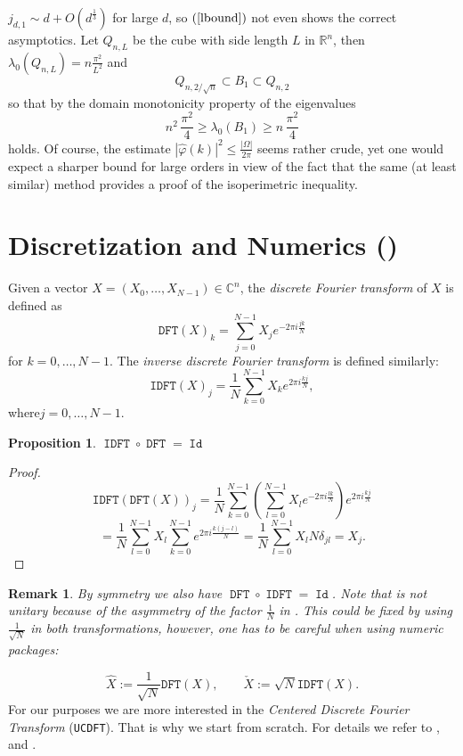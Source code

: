 \documentclass[12pt,a4paper]{article}
\newcommand{\RR}[1]{\mathbb{R}^#1}
\newtheorem{prop}{Proposition}
\newtheorem{remark}{Remark}
\newcommand{\assign}{:=}
\newcommand{\tmem}[1]{{\em #1\/}}
\newcommand{\tmop}[1]{\ensuremath{\operatorname{#1}}}
\newcommand{\tmverbatim}[1]{{\ttfamily{#1}}}
\begin{document}
\begin{appendices}
$j_{d,1} \sim d+O(d^\frac{1}{3})$ for large $d$, so $(\ref{lbound})$ not even
shows the correct asymptotics. Let $Q_{n,L}$ be the cube with side length $L$ in
$\RR n$, then $\lambda_0(Q_{n,L})=n \frac{\pi^2}{L^2}$ and
%
\begin{displaymath}
     Q_{n,{2/\sqrt{n}}} \subset B_1 \subset Q_{n,2}
\end{displaymath}   
%
so that by the domain monotonicity property of the eigenvalues
%
\begin{displaymath}
        n^2\,\frac{\pi^2}{4}\geq \lambda_0(B_1) \geq n\,\frac{\pi^2}{4}
\end{displaymath}
holds. Of course, the estimate $|\hat\varphi(k)|^2\leq\frac{|\Omega|}{2\pi}$ seems
rather crude, yet one would expect a sharper bound for large orders in view of the
fact that the same (at least similar) method provides a proof of the isoperimetric
inequality.     
\section{Discretization and Numerics  (\tmverbatim{UCDFT})}
Given a vector $X = (X_0, \ldots, X_{N - 1}) \in \mathbb{C}^n$, the
{\tmem{discrete Fourier transform}} of $X$ is defined as
\[ \mathtt{DFT} (X)_k = \sum_{j = 0}^{N - 1} X_j e^{- 2 \pi i \frac{jk}{N}}
\]
for $k = 0, \ldots, N - 1.$ The {\tmem{inverse discrete Fourier transform}} is
defined similarly:
\[ \mathtt{IDFT} (X)_j = \frac{1}{N} \sum_{k = 0}^{N - 1} X_k e^{2 \pi i
   \frac{kj}{N}}, \]
where$j = 0, \ldots, N - 1.$
\begin{prop}
  $\mathtt{\tmop{IDFT} \circ \tmop{DFT} = \tmop{Id}}$
\end{prop}
\begin{proof}
  \[ \mathtt{IDFT} \left( \mathtt{DFT} (X) \right)_j = \frac{1}{N} \sum_{k =
     0}^{N - 1} \left( \sum_{l = 0}^{N - 1} X_l e^{- 2 \pi i \frac{lk}{N}}
     \right) e^{2 \pi i \frac{kj}{N}} \]
  \[ = \frac{1}{N} \sum_{l = 0}^{N - 1} X_l  \sum_{k = 0}^{N - 1} e^{2 \pi i
     \frac{k (j - l)}{N}} = \frac{1}{N} \sum_{l = 0}^{N - 1} X_l N \delta_{j
     l} = X_j . \]
%  
\end{proof}
%
\begin{remark}
  By symmetry we also have $\mathtt{\tmop{DFT} \circ \tmop{IDFT} =
  \tmop{Id}}$. Note that \tmverbatim{DFT} is not unitary because of the
  asymmetry of the factor $\frac{1}{N}$ in \tmverbatim{IDFT}. This could be
  fixed by using $\frac{1}{\sqrt{N}}$ in both transformations, however, one
  has to be careful when using numeric packages:
\end{remark}
\[ \hat{X} \assign \frac{1}{\sqrt{N}} \mathtt{DFT} (X), \hspace{2em} \check{X}
   \assign \sqrt{N} \mathtt{IDFT} (X) . \]
%
For our purposes we are more interested in the {\sl Centered Discrete Fourier
Transform} ({\tt UCDFT}). That is why we start from scratch. For details we
refer to \cite{auslander1979},\cite{Grunbaum1982} and \cite{Mugler2011}. 
%

\end{appendices}
\end{document}
